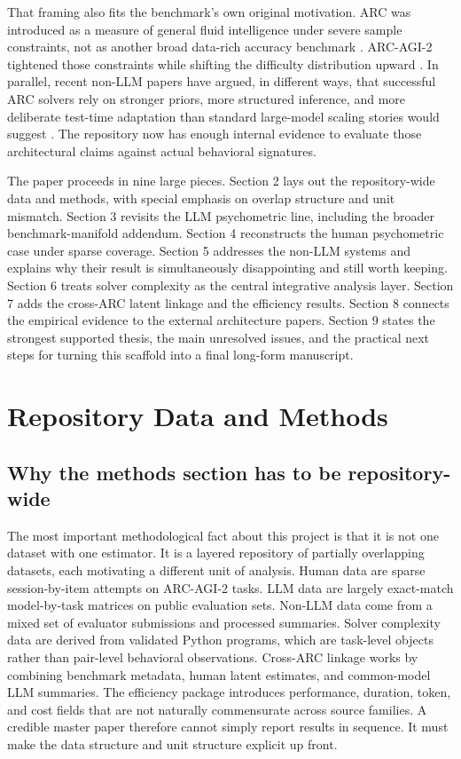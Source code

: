 \documentclass[11pt,letterpaper]{article}
\begin{document}
That framing also fits the benchmark's own original motivation. ARC was introduced as a measure of general fluid intelligence under severe sample constraints, not as another broad data-rich accuracy benchmark \cite{chollet2019arc}. ARC-AGI-2 tightened those constraints while shifting the difficulty distribution upward \cite{arcprizefoundation2025}. In parallel, recent non-LLM papers have argued, in different ways, that successful ARC solvers rely on stronger priors, more structured inference, and more deliberate test-time adaptation than standard large-model scaling stories would suggest \cite{gao2025urm, hu2025varc, jolicoeur2025trm, mcgovern2025ttatrm}. The repository now has enough internal evidence to evaluate those architectural claims against actual behavioral signatures.

The paper proceeds in nine large pieces. Section 2 lays out the repository-wide data and methods, with special emphasis on overlap structure and unit mismatch. Section 3 revisits the LLM psychometric line, including the broader benchmark-manifold addendum. Section 4 reconstructs the human psychometric case under sparse coverage. Section 5 addresses the non-LLM systems and explains why their result is simultaneously disappointing and still worth keeping. Section 6 treats solver complexity as the central integrative analysis layer. Section 7 adds the cross-ARC latent linkage and the efficiency results. Section 8 connects the empirical evidence to the external architecture papers. Section 9 states the strongest supported thesis, the main unresolved issues, and the practical next steps for turning this scaffold into a final long-form manuscript.

\section{Repository Data and Methods}

\subsection{Why the methods section has to be repository-wide}

The most important methodological fact about this project is that it is not one dataset with one estimator. It is a layered repository of partially overlapping datasets, each motivating a different unit of analysis. Human data are sparse session-by-item attempts on ARC-AGI-2 tasks. LLM data are largely exact-match model-by-task matrices on public evaluation sets. Non-LLM data come from a mixed set of evaluator submissions and processed summaries. Solver complexity data are derived from validated Python programs, which are task-level objects rather than pair-level behavioral observations. Cross-ARC linkage works by combining benchmark metadata, human latent estimates, and common-model LLM summaries. The efficiency package introduces performance, duration, token, and cost fields that are not naturally commensurate across source families. A credible master paper therefore cannot simply report results in sequence. It must make the data structure and unit structure explicit up front.
\end{document}
